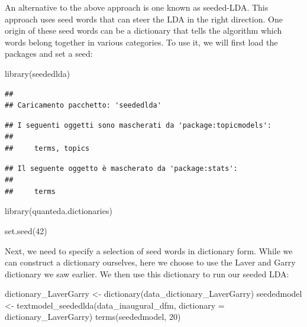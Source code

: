 \documentclass[
]{article}
\newenvironment{Shaded}{\begin{snugshade}}{\end{snugshade}}
\newcommand{\AttributeTok}[1]{\textcolor[rgb]{0.77,0.63,0.00}{#1}}
\newcommand{\DecValTok}[1]{\textcolor[rgb]{0.00,0.00,0.81}{#1}}
\newcommand{\FunctionTok}[1]{\textcolor[rgb]{0.00,0.00,0.00}{#1}}
\newcommand{\NormalTok}[1]{#1}
\newcommand{\OtherTok}[1]{\textcolor[rgb]{0.56,0.35,0.01}{#1}}
\begin{document}
An alternative to the above approach is one known as seeded-LDA. This approach uses seed words that can steer the LDA in the right direction. One origin of these seed words can be a dictionary that tells the algorithm which words belong together in various categories. To use it, we will first load the packages and set a seed:

\begin{Shaded}
\begin{Highlighting}[]
\FunctionTok{library}\NormalTok{(seededlda)}
\end{Highlighting}
\end{Shaded}

\begin{verbatim}
## 
## Caricamento pacchetto: 'seededlda'
\end{verbatim}

\begin{verbatim}
## I seguenti oggetti sono mascherati da 'package:topicmodels':
## 
##     terms, topics
\end{verbatim}

\begin{verbatim}
## Il seguente oggetto è mascherato da 'package:stats':
## 
##     terms
\end{verbatim}

\begin{Shaded}
\begin{Highlighting}[]
\FunctionTok{library}\NormalTok{(quanteda.dictionaries)}

\FunctionTok{set.seed}\NormalTok{(}\DecValTok{42}\NormalTok{)}
\end{Highlighting}
\end{Shaded}

Next, we need to specify a selection of seed words in dictionary form. While we can construct a dictionary ourselves, here we choose to use the Laver and Garry dictionary we saw earlier. We then use this dictionary to run our seeded LDA:

\begin{Shaded}
\begin{Highlighting}[]
\NormalTok{dictionary\_LaverGarry }\OtherTok{\textless{}{-}} \FunctionTok{dictionary}\NormalTok{(data\_dictionary\_LaverGarry)}
\NormalTok{seededmodel }\OtherTok{\textless{}{-}} \FunctionTok{textmodel\_seededlda}\NormalTok{(data\_inaugural\_dfm, }\AttributeTok{dictionary =}\NormalTok{ dictionary\_LaverGarry)}
\FunctionTok{terms}\NormalTok{(seededmodel, }\DecValTok{20}\NormalTok{)}
\end{Highlighting}
\end{Shaded}
\end{document}
